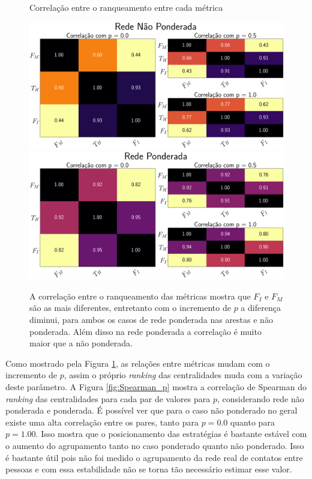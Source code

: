 \begin{figure}[H]
    \centering
    \captionsetup{font=normalsize,skip=0.8pt,singlelinecheck=on,labelsep=endash}
    \caption{Correlação entre o ranqueamento entre cada métrica}
    
    \includegraphics[scale= 0.4]{figuras/corr_p.png}
    \\
    \includegraphics[scale= 0.4]{figuras/corr_p_ponderado.png}
    \captionsetup{font=small,justification=justified}
    \caption*{A correlação entre o ranqueamento das métricas mostra que $F_I$ e $F_M$ são as mais diferentes, entretanto com o incremento de $p$ a diferença diminui, para ambos os casos de rede ponderada nas arestas e não ponderada. Além disso na rede ponderada a correlação é muito maior que a não ponderada.}
    \label{fig:Spearman}
\end{figure}

Como mostrado pela Figura \ref{fig:Spearman}, as relações entre métricas mudam com o incremento de $p$, assim o próprio \textit{ranking} das centralidades muda com a variação deste parâmetro. A Figura \ref{fig:Spearman_p} mostra a correlação de Spearman do \textit{ranking} das centralidades para cada par de valores para $p$, considerando rede não ponderada e ponderada. É possível ver que para o caso não ponderado no geral existe uma alta correlação entre os pares, tanto para $p = 0.0$ quanto para $p = 1.00$. Isso mostra que o posicionamento das estratégias é bastante estável com o aumento do agrupamento tanto no caso ponderado quanto não ponderado. Isso é bastante útil pois não foi medido o agrupamento da rede real de contatos entre pessoas e com essa estabilidade não se torna tão necessário estimar esse valor.

